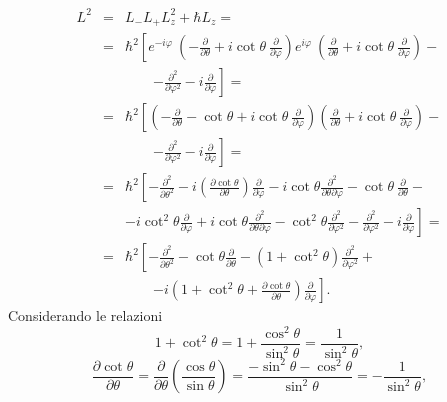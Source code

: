 \begin{eqnarray}
L^2 &=& L_-L_+ L_z^2 +\hbar L_z = \nonumber \\
&=& \hbar ^2 \left[e^{-i\varphi}\ \left(-\frac{\partial}{\partial \theta}+i \cot \theta\ \frac{\partial}{\partial \varphi}\right)e^{i\varphi}\ \left(\frac{\partial}{\partial \theta}+i \cot \theta\ \frac{\partial}{\partial \varphi}\right)-\right. \nonumber \\
& &\qquad \left. -\frac{\partial ^2}{\partial \varphi ^2}- i\frac{\partial}{\partial \varphi}\right] = \nonumber \\
&=&\hbar ^ 2 \left[ \left( -\frac{\partial}{\partial \theta}-\cot\theta +i \cot\theta\ \frac{\partial}{\partial \varphi}\right)\left(\frac{\partial}{\partial \theta}+i \cot \theta \ \frac{\partial}{\partial \varphi}\right)-\right. \nonumber \\
& &\qquad \left. -\frac{\partial ^2}{\partial \varphi ^2}- i\frac{\partial}{\partial \varphi}\right] = \nonumber \\
&=& \hbar ^2 \left[ -\frac{\partial ^2}{\partial \theta ^2}-i\left( \frac{\partial \cot \theta}{\partial \theta}\right) \frac{\partial }{\partial \varphi }-i\cot \theta \frac{\partial ^2}{\partial \theta \partial \varphi}-\cot \theta\ \frac{\partial }{\partial \theta}-\right. \nonumber \\
& & \left. -i \cot ^2 \theta \frac{\partial }{\partial \varphi}+i \cot\theta \frac{\partial ^2}{\partial \theta \partial \varphi}-\cot ^2 \theta \frac{\partial ^2}{\partial \varphi ^2}-\frac{\partial ^2}{\partial \varphi ^2}-i\frac{\partial }{\partial \varphi}\right] = \nonumber \\
&=& \hbar^2 \left[ -\frac{\partial ^2}{\partial \theta ^2}-\cot \theta \frac{\partial }{\partial \theta}-\left(1+ \cot ^2 \theta\right) \frac{\partial ^2}{\partial \varphi ^2}+\right. \nonumber \\
& &\qquad \left. -i\left( 1+\cot ^2 \theta +\frac{\partial \cot \theta}{\partial \theta}\right)\frac{\partial}{\partial \varphi}\right] .
\end{eqnarray}
Considerando le relazioni
\begin{equation}
1+ \cot ^2 \theta = 1+\frac{\cos ^2 \theta}{\sin ^2 \theta} = \frac{1}{\sin ^2 \theta},
\end{equation}
\begin{equation}
\frac{\partial \cot \theta}{\partial \theta}= \frac{\partial}{\partial \theta}\left( \frac{\cos  \theta}{\sin \theta} \right) = \frac{-\sin ^ 2 \theta - \cos ^2 \theta}{\sin ^2 \theta}=-\frac{1}{\sin ^2 \theta},
\end{equation}
